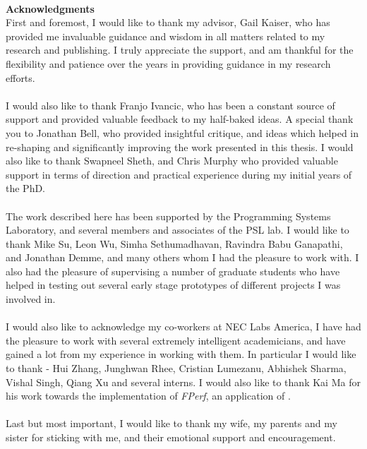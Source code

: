 ~\\[1in] %
\textbf{\Huge Acknowledgments}\\

\noindent 
First and foremost, I would like to thank my advisor, Gail Kaiser, who has provided me invaluable guidance and wisdom in all matters related to my research and publishing. I truly appreciate the support, and am thankful for the flexibility and patience over the years in providing guidance in my research efforts.
\\ \\
I would also like to thank Franjo Ivancic, who has been a constant source of support and provided valuable feedback to my half-baked ideas.
A special thank you to Jonathan Bell, who provided insightful critique, and ideas which helped in re-shaping and significantly improving the work presented in this thesis. I would also like to thank Swapneel Sheth, and Chris Murphy who provided valuable support in terms of direction and practical experience during my initial years of the PhD.
\\ \\
The work described here has been supported by the Programming Systems Laboratory, and several members and associates of the PSL lab. 
I would like to thank Mike Su, Leon Wu, Simha Sethumadhavan, Ravindra Babu Ganapathi, and Jonathan Demme, and many others whom I had the pleasure to work with. I also had the pleasure of supervising a number of graduate students who have helped in testing out several early stage prototypes of different projects I was involved in.
\\ \\
I would also like to acknowledge my co-workers at NEC Labs America, I have had the pleasure to work with several extremely intelligent academicians, and have gained a lot from my experience in working with them. In particular I would like to thank - Hui Zhang, Junghwan Rhee, Cristian Lumezanu, Abhishek Sharma, Vishal Singh, Qiang Xu and several interns. I would also like to thank Kai Ma for his work towards the implementation of \emph{FPerf}, an application of \iprobe. 
\\ \\
Last but most important, I would like to thank my wife, my parents and my sister for sticking with me, and their emotional support and encouragement.
